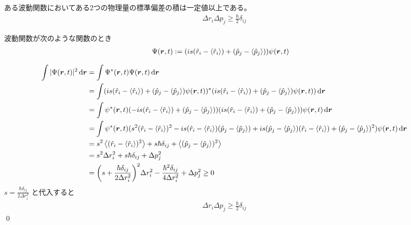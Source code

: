 \documentclass[uplatex,dvipdfmx,a4paper,11pt]{jlreq}
\makeatletter
\newcommand{\rr}{\bm{r}}
\numberwithin{equation}{section}
\theoremstyle{definition}
\renewenvironment{proof}[1][\proofname]{\par
  \normalfont
  \topsep6\p@\@plus6\p@ \trivlist
  \item[\hskip\labelsep{\bfseries #1}\@addpunct{\bfseries}]\ignorespaces\quad\par
}{%
  \qed\endtrivlist\@endpefalse
}
\renewcommand\proofname{証明}
\makeatother
\begin{document}
\begin{theorem}[不確定性原理]
  ある波動関数においてある2つの物理量の標準偏差の積は一定値以上である。
  \begin{align}
    \Delta r_i\Delta p_j \geq \frac{\hbar}{2}\delta_{ij}
  \end{align}
\end{theorem}
\begin{proof}
  波動関数が次のような関数のとき
  \begin{align}
    \Psi(\rr, t) & := (is(\hat{r}_i - \ev{\hat{r}_i}) + (\hat{p}_j - \ev{\hat{p}_j}))\psi(\rr, t)
  \end{align}

  \begin{align}
    \int|\Psi(\rr, t)|^2\dd{\rr} & = \int\Psi^*(\rr, t)\Psi(\rr, t)\dd{\rr}                                                                                                                                                                                               \\
                                 & = \int(is(\hat{r}_i - \ev{\hat{r}_i}) + (\hat{p}_j - \ev{\hat{p}_j})\psi(\rr, t))^*(is(\hat{r}_i - \ev{\hat{r}_i}) + (\hat{p}_j - \ev{\hat{p}_j})\psi(\rr, t))\dd{\rr}                                                                 \\
                                 & = \int\psi^*(\rr, t)(-is(\hat{r}_i - \ev{\hat{r}_i}) + (\hat{p}_j - \ev{\hat{p}_j}))(is(\hat{r}_i - \ev{\hat{r}_i}) + (\hat{p}_j - \ev{\hat{p}_j}))\psi(\rr, t)\dd{\rr}                                                                \\
                                 & = \int\psi^*(\rr, t)(s^2(\hat{r}_i - \ev{\hat{r}_i})^2 - is(\hat{r}_i - \ev{\hat{r}_i})(\hat{p}_j - \ev{\hat{p}_j}) + is(\hat{p}_j - \ev{\hat{p}_j})(\hat{r}_i - \ev{\hat{r}_i}) + (\hat{p}_j - \ev{\hat{p}_j})^2)\psi(\rr, t)\dd{\rr} \\
                                 & = s^2\ev{(\hat{r}_i - \ev{\hat{r}_i})^2} + s\hbar\delta_{ij} + \ev{(\hat{p}_j - \ev{\hat{p}_j})^2}                                                                                                                                     \\
                                 & = s^2\Delta r_i^2 + s\hbar\delta_{ij} + \Delta p_j^2                                                                                                                                                                                   \\
                                 & = \qty(s + \frac{\hbar\delta_{ij}}{2\Delta r_i^2})^2\Delta r_i^2 - \frac{\hbar^2\delta_{ij}}{4\Delta r_i^2} + \Delta p_j^2 \geq 0                                                                                                      \\
  \end{align}
  $s = \frac{\hbar\delta_{ij}}{2\Delta r_i^2}$ と代入すると
  \begin{align}
    \Delta r_i\Delta p_j \geq \frac{\hbar}{2}\delta_{ij}
  \end{align}
\end{proof}
\end{document}
